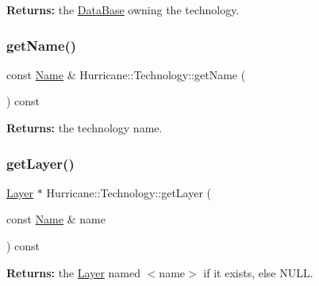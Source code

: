 {\bfseries Returns\+:} the \mbox{\hyperlink{classHurricane_1_1DataBase}{Data\+Base}} owning the technology. \mbox{\label{classHurricane_1_1Technology_ae466071aa1991c853ee71af12fa62d4e}} 
\subsubsection{\texorpdfstring{get\+Name()}{getName()}}
{\footnotesize\ttfamily const \mbox{\hyperlink{classHurricane_1_1Name}{Name}} \& Hurricane\+::\+Technology\+::get\+Name (\begin{DoxyParamCaption}{ }\end{DoxyParamCaption}) const\hspace{0.3cm}{\ttfamily [inline]}}

{\bfseries Returns\+:} the technology name. \mbox{\label{classHurricane_1_1Technology_a4ec69c9f8f6b483885f1900c56a97b61}} 
\subsubsection{\texorpdfstring{get\+Layer()}{getLayer()}\hspace{0.1cm}{\footnotesize\ttfamily [1/2]}}
{\footnotesize\ttfamily \mbox{\hyperlink{classHurricane_1_1Layer}{Layer}} $\ast$ Hurricane\+::\+Technology\+::get\+Layer (\begin{DoxyParamCaption}\item[{const \mbox{\hyperlink{classHurricane_1_1Name}{Name}} \&}]{name }\end{DoxyParamCaption}) const\hspace{0.3cm}{\ttfamily [inline]}}

{\bfseries Returns\+:} the \mbox{\hyperlink{classHurricane_1_1Layer}{Layer}} named {\ttfamily $<$name$>$} if it exists, else {\ttfamily N\+U\+LL}. \mbox{\label{classHurricane_1_1Technology_ab096154ce9485cef02244f0037efd4fb}} 
